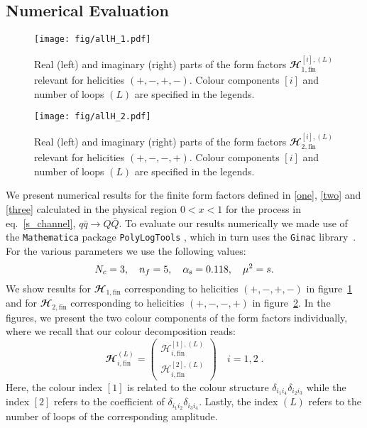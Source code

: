 \subsection{Numerical Evaluation}

\begin{figure}
\center
\texttt{[image: fig/allH\_1.pdf]}
\caption{Real (left) and imaginary (right) parts of the form factors $\mathbfcal{H}_{1,\text{fin}}^{[i],(L)}$ relevant for helicities $(+,-,+,-)$.   Colour components $[i]$ and number of loops $(L)$ are specified in the legends.}
\label{allH_1}
\end{figure} 

\begin{figure}
\center
\texttt{[image: fig/allH\_2.pdf]}
\caption{Real (left) and imaginary (right) parts of the form factors $\mathbfcal{H}_{2,\text{fin}}^{[i],(L)}$ relevant for helicities $(+,-,-,+)$.   Colour components $[i]$ and number of loops $(L)$ are specified in the legends. }
\label{allH_2}
\end{figure} 
We present numerical results for the finite form factors defined in  \eqref{one}, \eqref{two} and \eqref{three} calculated in the physical region $0<x<1$ for the process in eq.~\eqref{s_channel}, $q\bar{q}\to Q\bar{Q}$. To evaluate our results numerically we made use of the \texttt{Mathematica} package \texttt{PolyLogTools} \cite{Duhr:2019tlz},
which in turn uses the \texttt{Ginac} library~\cite{Bauer:2000cp,cln,Vollinga:2004sn}.
For the various parameters we use the following values:
\begin{equation}
N_c = 3, \quad n_f = 5, \quad \alpha_\mathrm{s} = 0.118, \quad  \mu^2 = s.
\end{equation}
We show results for $\mathbfcal{H}_{1,\text{fin}}$ corresponding to helicities $(+,-,+,-)$ in figure~\ref{allH_1} and for $\mathbfcal{H}_{2,\text{fin}}$ corresponding to helicities $(+,-,-,+)$ in figure~\ref{allH_2}.
In the figures, we present the two colour components of the form factors individually, where we recall that our colour decomposition reads: 
\begin{equation}
{\mathbfcal{H}}_{i,\text{fin}}^{(L)}  
= 
\begin{pmatrix}
{\mathcal{H}}_{i,\text{fin}}^{[1],(L)}  \\
{\mathcal{H}}_{i,\text{fin}}^{[2],(L)} 
\end{pmatrix} \quad i=1,2 \; .
\end{equation}
Here, the colour index $[1]$ is related to the colour structure  ${\delta}_{ i_1 i_4} {\delta}_{i_2 i_3}$ while the index $[2]$ refers to the coefficient of ${\delta}_{ i_1 i_2} {\delta}_{ i_3 i_4}$.
Lastly, the index $(L)$ refers to the number of loops of the corresponding amplitude.  


